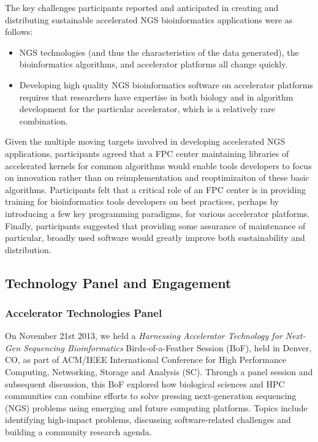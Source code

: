The key challenges participants reported and anticipated in creating and distributing sustainable accelerated NGS bioinformatics applications were as follows:
\begin{itemize}
\item	NGS technologies (and thus the characteristics of the data generated), the  bioinformatics algorithms, and accelerator platforms all change quickly. 
\item	Developing high quality NGS bioinformatics software on accelerator platforms requires that researchers have expertise in both biology and in algorithm development for the particular accelerator, which is a relatively rare combination.
\end{itemize}

Given the multiple moving targets involved in developing accelerated NGS applications, participants agreed that a FPC center maintaining libraries of accelerated kernels for common algorithms would enable tools developers to focus on innovation rather than on reimplementation and reoptimizaiton of these basic algorithms. Participants felt that a critical role of an FPC center is in providing training for bioinformatics tools developers  on best practices, perhaps by introducing a few key programming paradigms, for various accelerator platforms. Finally, participants suggested that providing some assurance of maintenance of particular, broadly used software would greatly improve both sustainability and distribution. 

\subsection{Technology Panel and Engagement}

\subsubsection{Accelerator Technologies Panel}

On November 21st 2013, we held a \textit{Harnessing Accelerator Technology for Next-Gen Sequencing Bioinformatics} Birds-of-a-Feather Session (BoF), 
held in Denver, CO, as part of ACM/IEEE International Conference for High Performance Computing, Networking,
Storage and Analysis (SC). Through a panel session and subsequent discussion, this BoF explored how biological sciences and HPC communities can combine efforts to solve pressing next-generation sequencing (NGS) problems using emerging and future computing platforms. Topics include identifying high-impact problems, discussing software-related challenges and building a community research agenda.


